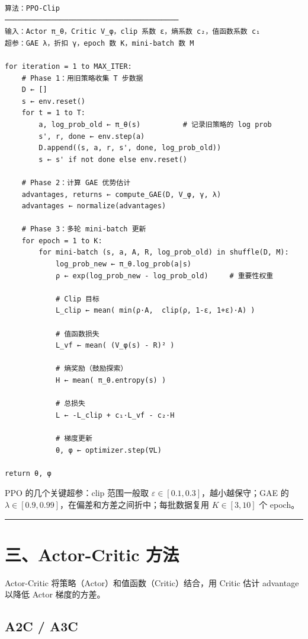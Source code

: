 \begin{verbatim}
算法：PPO-Clip
─────────────────────────────────────────
输入：Actor π_θ，Critic V_φ，clip 系数 ε，熵系数 c₂，值函数系数 c₁
超参：GAE λ，折扣 γ，epoch 数 K，mini-batch 数 M

for iteration = 1 to MAX_ITER:
    # Phase 1：用旧策略收集 T 步数据
    D ← []
    s ← env.reset()
    for t = 1 to T:
        a, log_prob_old ← π_θ(s)          # 记录旧策略的 log prob
        s', r, done ← env.step(a)
        D.append((s, a, r, s', done, log_prob_old))
        s ← s' if not done else env.reset()
    
    # Phase 2：计算 GAE 优势估计
    advantages, returns ← compute_GAE(D, V_φ, γ, λ)
    advantages ← normalize(advantages)
    
    # Phase 3：多轮 mini-batch 更新
    for epoch = 1 to K:
        for mini-batch (s, a, A, R, log_prob_old) in shuffle(D, M):
            log_prob_new ← π_θ.log_prob(a|s)
            ρ ← exp(log_prob_new - log_prob_old)     # 重要性权重
            
            # Clip 目标
            L_clip ← mean( min(ρ·A,  clip(ρ, 1-ε, 1+ε)·A) )
            
            # 值函数损失
            L_vf ← mean( (V_φ(s) - R)² )
            
            # 熵奖励（鼓励探索）
            H ← mean( π_θ.entropy(s) )
            
            # 总损失
            L ← -L_clip + c₁·L_vf - c₂·H
            
            # 梯度更新
            θ, φ ← optimizer.step(∇L)

return θ, φ
\end{verbatim}

PPO 的几个关键超参：clip 范围一般取 \(\varepsilon \in [0.1, 0.3]\)，越小越保守；GAE 的 \(\lambda \in [0.9, 0.99]\)，在偏差和方差之间折中；每批数据复用 \(K \in [3, 10]\) 个 epoch。

\hrule

\section{三、Actor-Critic 方法}

Actor-Critic 将策略（Actor）和值函数（Critic）结合，用 Critic 估计 advantage 以降低 Actor 梯度的方差。

\subsection{A2C / A3C}

